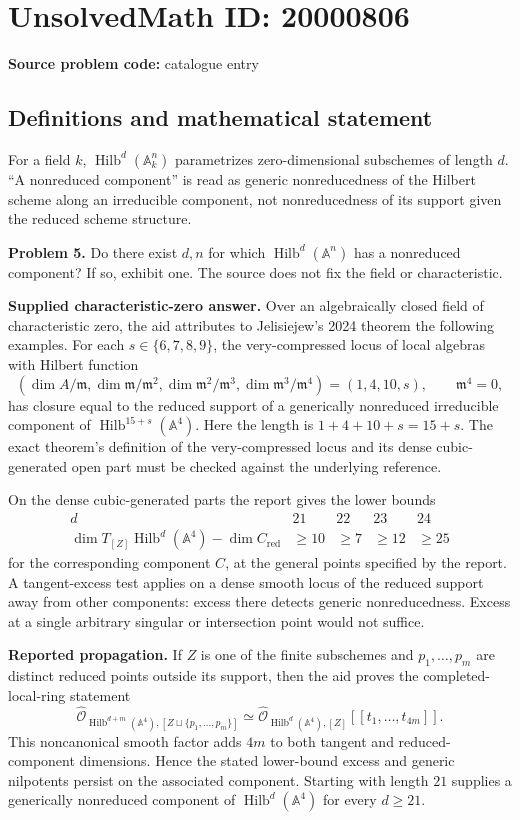 \documentclass[11pt]{article}
\newcommand{\A}{\mathbb{A}}
\begin{document}
\section*{UnsolvedMath ID: 20000806}
\textbf{Source problem code:} catalogue entry
\subsection{Definitions and mathematical statement}
For a field $k$, $\operatorname{Hilb}^d(\A_k^n)$ parametrizes zero-dimensional subschemes of length $d$. ``A nonreduced component'' is read as generic nonreducedness of the Hilbert scheme along an irreducible component, not nonreducedness of its support given the reduced scheme structure.

\textbf{Problem 5.} Do there exist $d,n$ for which $\operatorname{Hilb}^d(\A^n)$ has a nonreduced component? If so, exhibit one. The source does not fix the field or characteristic.

\textbf{Supplied characteristic-zero answer.} Over an algebraically closed field of characteristic zero, the aid attributes to Jelisiejew's 2024 theorem the following examples. For each $s\in\{6,7,8,9\}$, the very-compressed locus of local algebras with Hilbert function
\[
 (\dim A/\mathfrak m,\dim\mathfrak m/\mathfrak m^2,
 \dim\mathfrak m^2/\mathfrak m^3,\dim\mathfrak m^3/\mathfrak m^4)
 =(1,4,10,s),\qquad\mathfrak m^4=0,
\]
has closure equal to the reduced support of a generically nonreduced irreducible component of $\operatorname{Hilb}^{15+s}(\A^4)$. Here the length is $1+4+10+s=15+s$. The exact theorem's definition of the very-compressed locus and its dense cubic-generated open part must be checked against the underlying reference.

On the dense cubic-generated parts the report gives the lower bounds
\[
 \begin{array}{c|rrrr}
 d&21&22&23&24\\\hline
 \dim T_{[Z]}\operatorname{Hilb}^d(\A^4)-\dim C_{\mathrm{red}}
 &\geq10&\geq7&\geq12&\geq25
 \end{array}
\]
for the corresponding component $C$, at the general points specified by the report. A tangent-excess test applies on a dense smooth locus of the reduced support away from other components: excess there detects generic nonreducedness. Excess at a single arbitrary singular or intersection point would not suffice.

\textbf{Reported propagation.} If $Z$ is one of the finite subschemes and $p_1,\ldots,p_m$ are distinct reduced points outside its support, then the aid proves the completed-local-ring statement
\[
 \widehat{\mathcal O}_{\operatorname{Hilb}^{d+m}(\A^4),[Z\sqcup\{p_1,\ldots,p_m\}]}
 \simeq
 \widehat{\mathcal O}_{\operatorname{Hilb}^{d}(\A^4),[Z]}
 [[t_1,\ldots,t_{4m}]].
\]
This noncanonical smooth factor adds $4m$ to both tangent and reduced-component dimensions. Hence the stated lower-bound excess and generic nilpotents persist on the associated component. Starting with length $21$ supplies a generically nonreduced component of $\operatorname{Hilb}^d(\A^4)$ for every $d\geq21$.
\end{document}
